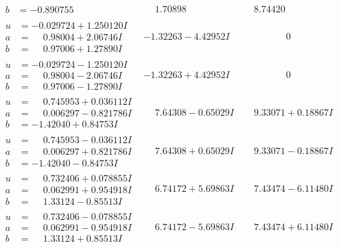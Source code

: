 \documentclass[1p]{elsarticle_modified}
\theoremstyle{definition}
\begin{document}
$$\begin{array}{c|c|c}
\begin{aligned}
b &= -0.890755\phantom{ +0.000000I}\end{aligned}
 & \phantom{-}1.70898\phantom{ +0.000000I} & \phantom{-}8.74420\phantom{ +0.000000I} \\ \hline\begin{aligned}
u &= -0.029724 + 1.250120 I \\
a &= \phantom{-}0.98004 + 2.06746 I \\
b &= \phantom{-}0.97006 + 1.27890 I\end{aligned}
 & -1.32263 - 4.42952 I & \phantom{-0.000000 } 0 \\ \hline\begin{aligned}
u &= -0.029724 - 1.250120 I \\
a &= \phantom{-}0.98004 - 2.06746 I \\
b &= \phantom{-}0.97006 - 1.27890 I\end{aligned}
 & -1.32263 + 4.42952 I & \phantom{-0.000000 } 0 \\ \hline\begin{aligned}
u &= \phantom{-}0.745953 + 0.036112 I \\
a &= \phantom{-}0.006297 - 0.821786 I \\
b &= -1.42040 + 0.84753 I\end{aligned}
 & \phantom{-}7.64308 - 0.65029 I & \phantom{-}9.33071 + 0.18867 I \\ \hline\begin{aligned}
u &= \phantom{-}0.745953 - 0.036112 I \\
a &= \phantom{-}0.006297 + 0.821786 I \\
b &= -1.42040 - 0.84753 I\end{aligned}
 & \phantom{-}7.64308 + 0.65029 I & \phantom{-}9.33071 - 0.18867 I \\ \hline\begin{aligned}
u &= \phantom{-}0.732406 + 0.078855 I \\
a &= \phantom{-}0.062991 + 0.954918 I \\
b &= \phantom{-}1.33124 - 0.85513 I\end{aligned}
 & \phantom{-}6.74172 + 5.69863 I & \phantom{-}7.43474 - 6.11480 I \\ \hline\begin{aligned}
u &= \phantom{-}0.732406 - 0.078855 I \\
a &= \phantom{-}0.062991 - 0.954918 I \\
b &= \phantom{-}1.33124 + 0.85513 I\end{aligned}
 & \phantom{-}6.74172 - 5.69863 I & \phantom{-}7.43474 + 6.11480 I \\ \hline\begin{aligned}

\end{aligned}
\end{array}$$
\end{document}
